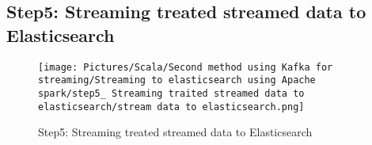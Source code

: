 \begin{spacing}{1.2}
\subsection{Step5: Streaming treated streamed data to Elasticsearch}

\begin{figure}[!htb] 
\begin{center} 
\texttt{[image: Pictures/Scala/Second method using Kafka for streaming/Streaming to elasticsearch using Apache spark/step5\_ Streaming traited streamed data to elasticsearch/stream data to elasticsearch.png]}
\end{center} 
\label{fig:broker-Kafka-1}
\caption{Step5: Streaming treated streamed data to Elasticsearch} 
\end{figure}  \FloatBarrier

\end{spacing}


